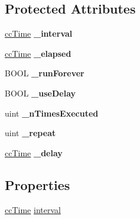 \subsection*{Protected Attributes}
\begin{DoxyCompactItemize}
\item 
\hypertarget{interface_c_c_timer_ac03e38ac4b394f7e82b8fefed59dd6e8}{\hyperlink{cc_types_8h_ae6c674aac4bfb46a4e6cb1e89bb66b4f}{cc\-Time} {\bfseries \-\_\-interval}}\label{interface_c_c_timer_ac03e38ac4b394f7e82b8fefed59dd6e8}

\item 
\hypertarget{interface_c_c_timer_aed63fbeb36d222ea19e5c91310397f59}{\hyperlink{cc_types_8h_ae6c674aac4bfb46a4e6cb1e89bb66b4f}{cc\-Time} {\bfseries \-\_\-elapsed}}\label{interface_c_c_timer_aed63fbeb36d222ea19e5c91310397f59}

\item 
\hypertarget{interface_c_c_timer_a4f5b9d9658e3091e0826fb592b325097}{B\-O\-O\-L {\bfseries \-\_\-run\-Forever}}\label{interface_c_c_timer_a4f5b9d9658e3091e0826fb592b325097}

\item 
\hypertarget{interface_c_c_timer_a6e0c0b911b48020b85954fd02cb17c12}{B\-O\-O\-L {\bfseries \-\_\-use\-Delay}}\label{interface_c_c_timer_a6e0c0b911b48020b85954fd02cb17c12}

\item 
\hypertarget{interface_c_c_timer_abe93719f2a38e7673d019787f8f8b8a1}{uint {\bfseries \-\_\-n\-Times\-Executed}}\label{interface_c_c_timer_abe93719f2a38e7673d019787f8f8b8a1}

\item 
\hypertarget{interface_c_c_timer_a69184eea51e77659e0d909f6c26f3c89}{uint {\bfseries \-\_\-repeat}}\label{interface_c_c_timer_a69184eea51e77659e0d909f6c26f3c89}

\item 
\hypertarget{interface_c_c_timer_ac78265becba5804f92abbfd87846d37a}{\hyperlink{cc_types_8h_ae6c674aac4bfb46a4e6cb1e89bb66b4f}{cc\-Time} {\bfseries \-\_\-delay}}\label{interface_c_c_timer_ac78265becba5804f92abbfd87846d37a}

\end{DoxyCompactItemize}
\subsection*{Properties}
\begin{DoxyCompactItemize}
\item 
\hyperlink{cc_types_8h_ae6c674aac4bfb46a4e6cb1e89bb66b4f}{cc\-Time} \hyperlink{interface_c_c_timer_aeaaa2a181fc46f104e567d69b96c6a47}{interval}
\end{DoxyCompactItemize}



